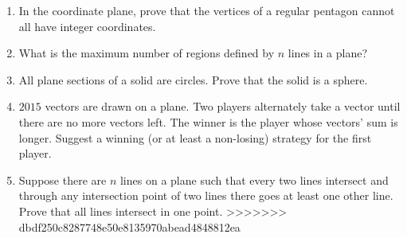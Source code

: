 \documentclass{article}
\begin{document}
\begin{enumerate}

	\item{In the coordinate plane, prove that the vertices of a regular pentagon cannot all have integer coordinates.}

	\item{What is the maximum number of regions defined by $n$ lines in a plane?}

    \item{All plane sections of a solid are circles. Prove that the solid is a sphere.}

    \item{$2015$ vectors are drawn on a plane. Two players alternately take a vector until there are no more vectors left. The winner is the player whose vectors’ sum is longer. Suggest a winning (or at least a non-losing) strategy for the first player}.

    \item{Suppose there are $n$ lines on a plane such that every two lines intersect and through any intersection point of two lines there goes at least one other line. Prove that all lines intersect in one point.}
>>>>>>> dbdf250c8287748e50e8135970abead4848812ea

\end{enumerate}
\end{document}
